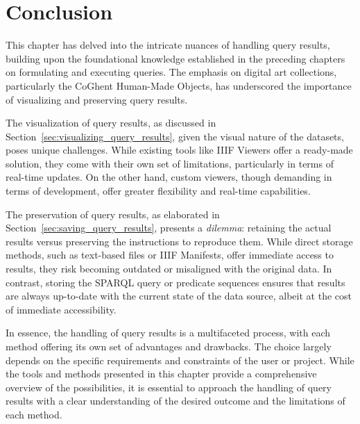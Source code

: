 \section{Conclusion}

This chapter has delved into the intricate nuances of handling query results, building upon the foundational knowledge established in the preceding chapters on formulating and executing queries. The emphasis on digital art collections, particularly the CoGhent Human-Made Objects, has underscored the importance of visualizing and preserving query results.

The visualization of query results, as discussed in Section~\ref{sec:visualizing_query_results}, given the visual nature of the datasets, poses unique challenges. While existing tools like IIIF Viewers offer a ready-made solution, they come with their own set of limitations, particularly in terms of real-time updates. On the other hand, custom viewers, though demanding in terms of development, offer greater flexibility and real-time capabilities.

The preservation of query results, as elaborated in Section~\ref{sec:saving_query_results}, presents a \textit{dilemma}: retaining the actual results versus preserving the instructions to reproduce them. While direct storage methods, such as text-based files or IIIF Manifests, offer immediate access to results, they risk becoming outdated or misaligned with the original data. In contrast, storing the SPARQL query or predicate sequences ensures that results are always up-to-date with the current state of the data source, albeit at the cost of immediate accessibility.

In essence, the handling of query results is a multifaceted process, with each method offering its own set of advantages and drawbacks. The choice largely depends on the specific requirements and constraints of the user or project. While the tools and methods presented in this chapter provide a comprehensive overview of the possibilities, it is essential to approach the handling of query results with a clear understanding of the desired outcome and the limitations of each method.